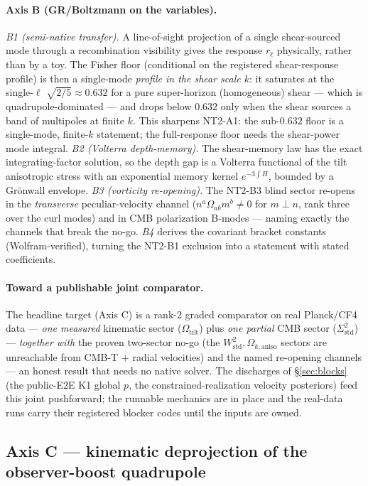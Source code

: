 \documentclass[11pt,a4paper]{article}
\newcommand{\Sigstd}{\Sigma^{2}_{\mathrm{std}}}
\newcommand{\Wstd}{W^{2}_{\mathrm{std}}}
\newcommand{\Otilt}{\Omega_{\mathrm{tilt}}}
\newcommand{\Okaniso}{\Omega_{k,\mathrm{aniso}}}
\theoremstyle{plain}
\theoremstyle{definition}
\begin{document}
\paragraph{Axis B (GR/Boltzmann on the variables).} \emph{B1 (semi-native
transfer).} A line-of-sight projection of a single shear-sourced mode through a
recombination visibility gives the response $r_\ell$ physically, rather than by a
toy. The Fisher floor (conditional on the registered shear-response profile) is
then a single-mode \emph{profile in the shear scale $k$}: it saturates at the
single-$\ell$ $\sqrt{2/5}\approx0.632$ for a pure super-horizon (homogeneous)
shear --- which is quadrupole-dominated --- and drops below $0.632$ only when the
shear sources a band of multipoles at finite $k$. This sharpens NT2-A1: the
sub-$0.632$ floor is a single-mode, finite-$k$ statement; the full-response floor
needs the shear-power mode integral. \emph{B2
(Volterra depth-memory).} The shear-memory law has the exact integrating-factor
solution, so the depth gap is a Volterra functional of the tilt anisotropic
stress with an exponential memory kernel $e^{-3\int H}$, bounded by a Grönwall
envelope. \emph{B3 (vorticity re-opening).} The NT2-B3 blind sector re-opens in
the \emph{transverse} peculiar-velocity channel ($n^a\Omega_{ab}m^b\neq0$ for
$m\perp n$, rank three over the curl modes) and in CMB polarization B-modes ---
naming exactly the channels that break the no-go. \emph{B4} derives the covariant
bracket constants (Wolfram-verified), turning the NT2-B1 exclusion into a
statement with stated coefficients.

\paragraph{Toward a publishable joint comparator.} The headline target (Axis C)
is a rank-2 graded comparator on real Planck/CF4 data --- \emph{one measured}
kinematic sector ($\Otilt$) plus \emph{one partial} CMB sector ($\Sigstd$) ---
\emph{together with} the proven two-sector no-go (the $\Wstd,\Okaniso$ sectors are
unreachable from CMB-T $+$ radial velocities) and the named re-opening channels
--- an honest result that needs no native solver. The
discharges of \S\ref{sec:blocks} (the public-E2E K1 global $p$, the
constrained-realization velocity posteriors) feed this joint pushforward; the
runnable mechanics are in place and the real-data runs carry their registered
blocker codes until the inputs are owned.

\subsection{Axis C --- kinematic deprojection of the observer-boost quadrupole}
\label{sec:axis-c}
\end{document}

